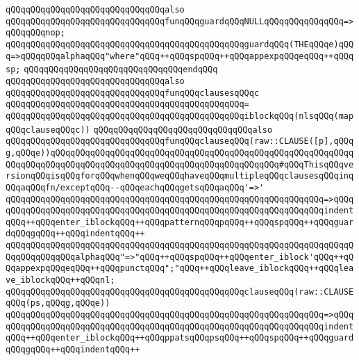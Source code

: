 \newline
\verb|qQQqqQQqqQQqqQQqqQQqqQQqqQQqqQQqalso|\newline
\verb|qQQqqQQqqQQqqQQqqQQqqQQqqQQqqQQqfunqQQqguardqQQqNULLqQQqqQQqqQQqqQQq=>qQQqqQQqnop;|\newline
\verb|qQQqqQQqqQQqqQQqqQQqqQQqqQQqqQQqqQQqqQQqqQQqqQQqguardqQQq(THEqQQqe)qQQq=>qQQqqQQqalphaqQQq"where"qQQq++qQQqspqQQq++qQQqappexpqQQqeqQQq++qQQqsp;|\newline
\verb|qQQqqQQqqQQqqQQqqQQqqQQqqQQqqQQqendqQQq|\newline
\newline
\verb|qQQqqQQqqQQqqQQqqQQqqQQqqQQqqQQqalso|\newline
\verb|qQQqqQQqqQQqqQQqqQQqqQQqqQQqqQQqfunqQQqclausesqQQqc|\newline
\verb|qQQqqQQqqQQqqQQqqQQqqQQqqQQqqQQqqQQqqQQqqQQqqQQq=|\newline
\verb|qQQqqQQqqQQqqQQqqQQqqQQqqQQqqQQqqQQqqQQqqQQqqQQqiblockqQQq(nlsqQQq(mapqQQqclauseqQQqc))|\newline
\newline
\verb|qQQqqQQqqQQqqQQqqQQqqQQqqQQqqQQqalso|\newline
\verb|qQQqqQQqqQQqqQQqqQQqqQQqqQQqqQQqfunqQQqclauseqQQq(raw::CLAUSE([p],qQQqg,qQQqe))qQQqqQQqqQQqqQQqqQQqqQQqqQQqqQQqqQQqqQQqqQQqqQQqqQQqqQQqqQQqqQQqqQQqqQQqqQQqqQQqqQQqqQQqqQQqqQQqqQQqqQQqqQQqqQQqqQQq#qQQqThisqQQqversionqQQqisqQQqforqQQqwhenqQQqweqQQqhaveqQQqmultipleqQQqclausesqQQqinqQQqaqQQqfn/exceptqQQq--qQQqeachqQQqgetsqQQqaqQQq'=>'|\newline
\verb|qQQqqQQqqQQqqQQqqQQqqQQqqQQqqQQqqQQqqQQqqQQqqQQqqQQqqQQqqQQqqQQq=>qQQq|\newline
\verb|qQQqqQQqqQQqqQQqqQQqqQQqqQQqqQQqqQQqqQQqqQQqqQQqqQQqqQQqqQQqqQQqindentqQQq++qQQqenter_iblockqQQq++qQQqpatternqQQqpqQQq++qQQqspqQQq++qQQqguardqQQqgqQQq++qQQqindentqQQq++|\newline
\verb|qQQqqQQqqQQqqQQqqQQqqQQqqQQqqQQqqQQqqQQqqQQqqQQqqQQqqQQqqQQqqQQqqQQqqQQqqQQqqQQqqQQqalphaqQQq"=>"qQQq++qQQqspqQQq++qQQqenter_iblock'qQQq++qQQqappexpqQQqeqQQq++qQQqpunctqQQq";"qQQq++qQQqleave_iblockqQQq++qQQqleave_iblockqQQq++qQQqnl;|\newline
\newline
\verb|qQQqqQQqqQQqqQQqqQQqqQQqqQQqqQQqqQQqqQQqqQQqqQQqclauseqQQq(raw::CLAUSEqQQq(ps,qQQqg,qQQqe))|\newline
\verb|qQQqqQQqqQQqqQQqqQQqqQQqqQQqqQQqqQQqqQQqqQQqqQQqqQQqqQQqqQQqqQQq=>qQQq|\newline
\verb|qQQqqQQqqQQqqQQqqQQqqQQqqQQqqQQqqQQqqQQqqQQqqQQqqQQqqQQqqQQqqQQqindentqQQq++qQQqenter_iblockqQQq++qQQqppatsqQQqpsqQQq++qQQqspqQQq++qQQqguardqQQqgqQQq++qQQqindentqQQq++|\newline
